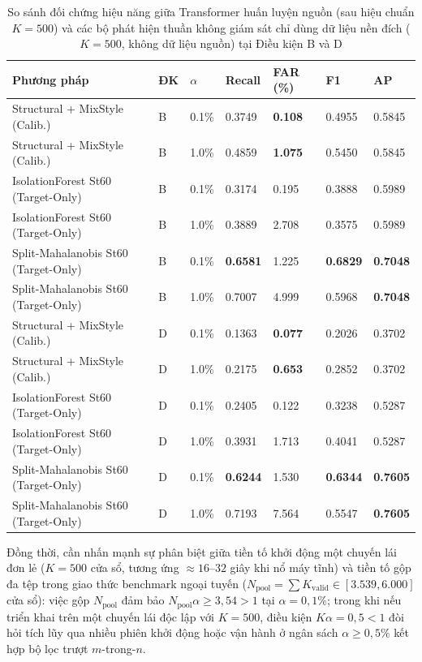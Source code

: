 \documentclass[12pt, a4paper, reqno, oneside]{book}
\begin{document}
{\renewcommand{\arraystretch}{0.85}
\begin{table}[htbp]\centering\footnotesize
\caption[So sánh đối chứng Transformer nguồn và bộ phát hiện thuần xe đích]{So sánh đối chứng hiệu năng giữa Transformer huấn luyện nguồn (sau hiệu chuẩn $K=500$) và các bộ phát hiện thuần không giám sát chỉ dùng dữ liệu nền đích ($K=500$, không dữ liệu nguồn) tại Điều kiện B và D}\label{tab:target-only-summary}
\begin{tabular}{P{4.4cm}P{0.8cm}P{1.0cm}P{1.6cm}P{1.8cm}P{1.6cm}P{1.6cm}}
\toprule
Phương pháp & ĐK & $\alpha$ & Recall & FAR (\%) & F1 & AP \\ \midrule
Structural + MixStyle (Calib.) & B & 0.1\% & 0.3749 & \textbf{0.108} & 0.4955 & 0.5845 \\
Structural + MixStyle (Calib.) & B & 1.0\% & 0.4859 & \textbf{1.075} & 0.5450 & 0.5845 \\
IsolationForest St60 (Target-Only) & B & 0.1\% & 0.3174 & 0.195 & 0.3888 & 0.5989 \\
IsolationForest St60 (Target-Only) & B & 1.0\% & 0.3889 & 2.708 & 0.3575 & 0.5989 \\
Split-Mahalanobis St60 (Target-Only)& B & 0.1\% & \textbf{0.6581} & 1.225 & \textbf{0.6829} & \textbf{0.7048} \\
Split-Mahalanobis St60 (Target-Only)& B & 1.0\% & 0.7007 & 4.999 & 0.5968 & \textbf{0.7048} \\
\midrule
Structural + MixStyle (Calib.) & D & 0.1\% & 0.1363 & \textbf{0.077} & 0.2026 & 0.3702 \\
Structural + MixStyle (Calib.) & D & 1.0\% & 0.2175 & \textbf{0.653} & 0.2852 & 0.3702 \\
IsolationForest St60 (Target-Only) & D & 0.1\% & 0.2405 & 0.122 & 0.3238 & 0.5287 \\
IsolationForest St60 (Target-Only) & D & 1.0\% & 0.3931 & 1.713 & 0.4041 & 0.5287 \\
Split-Mahalanobis St60 (Target-Only)& D & 0.1\% & \textbf{0.6244} & 1.530 & \textbf{0.6344} & \textbf{0.7605} \\
Split-Mahalanobis St60 (Target-Only)& D & 1.0\% & 0.7193 & 7.564 & 0.5547 & \textbf{0.7605} \\
\bottomrule
\end{tabular}
\end{table}}
Đồng thời, cần nhấn mạnh sự phân biệt giữa tiền tố khởi động một chuyến lái đơn lẻ ($K=500$ cửa sổ, tương ứng $\approx 16\text{--}32$ giây khi nổ máy tĩnh) và tiền tố gộp đa tệp trong giao thức benchmark ngoại tuyến ($N_{\text{pool}} = \sum K_{\text{valid}} \in [3.539, 6.000]$ cửa sổ): việc gộp $N_{\text{pool}}$ đảm bảo $N_{\text{pool}}\alpha \ge 3{,}54 > 1$ tại $\alpha=0{,}1\%$; trong khi nếu triển khai trên một chuyến lái độc lập với $K=500$, điều kiện $K\alpha = 0{,}5 < 1$ đòi hỏi tích lũy qua nhiều phiên khởi động hoặc vận hành ở ngân sách $\alpha \ge 0{,}5\%$ kết hợp bộ lọc trượt $m$-trong-$n$.
\end{document}
